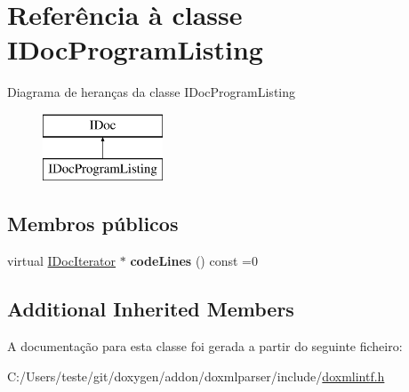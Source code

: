\hypertarget{class_i_doc_program_listing}{\section{Referência à classe I\-Doc\-Program\-Listing}
\label{class_i_doc_program_listing}
}
Diagrama de heranças da classe I\-Doc\-Program\-Listing\begin{figure}[H]
\begin{center}
\leavevmode
\includegraphics[height=2.000000cm]{class_i_doc_program_listing}
\end{center}
\end{figure}
\subsection*{Membros públicos}
\begin{DoxyCompactItemize}
\item 
\hypertarget{class_i_doc_program_listing_a30db0397a24e99838ab9610e8f8c115c}{virtual \hyperlink{class_i_doc_iterator}{I\-Doc\-Iterator} $\ast$ {\bfseries code\-Lines} () const =0}\label{class_i_doc_program_listing_a30db0397a24e99838ab9610e8f8c115c}

\end{DoxyCompactItemize}
\subsection*{Additional Inherited Members}


A documentação para esta classe foi gerada a partir do seguinte ficheiro\-:\begin{DoxyCompactItemize}
\item 
C\-:/\-Users/teste/git/doxygen/addon/doxmlparser/include/\hyperlink{include_2doxmlintf_8h}{doxmlintf.\-h}\end{DoxyCompactItemize}
